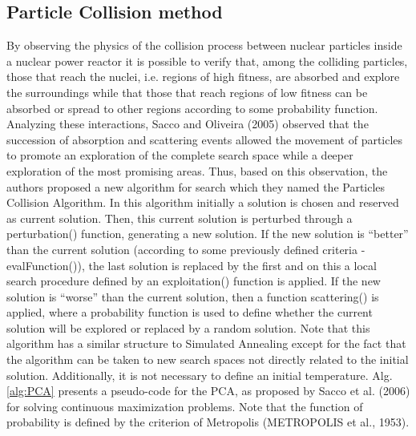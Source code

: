 \subsection{Particle Collision method}
\label{sec:PC}

By observing the physics of the collision process between nuclear particles inside a nuclear power reactor it is possible to verify that, among the colliding particles, those that reach the nuclei, i.e. regions of high fitness, are absorbed and explore the surroundings while that those that reach regions of low fitness can be absorbed or spread to other regions according to some probability function. Analyzing these interactions, Sacco and Oliveira (2005) observed that the succession of absorption and scattering events allowed the movement of particles to promote an exploration of the complete search space while a deeper exploration of the most promising areas. Thus, based on this observation, the authors proposed a new algorithm for search which they named the Particles Collision Algorithm. In this algorithm initially a solution is chosen and reserved as current solution. Then, this current solution is perturbed through a perturbation() function, generating a new solution. If the new solution is “better” than the current solution (according to some previously defined criteria - evalFunction()), the last solution is replaced by the first and on this a local search procedure defined by an exploitation() function is applied. If the new solution is “worse” than the current solution, then a function scattering() is applied, where a probability function is used to define whether the current solution will be explored or replaced by a random solution. Note that this algorithm has a similar structure to Simulated Annealing except for the fact that the algorithm can be taken to new search spaces not directly related to the initial solution. Additionally, it is not necessary to define an initial temperature. Alg. \ref{alg:PCA}  presents a pseudo-code for the PCA, as proposed by Sacco et al. (2006) for solving continuous maximization problems. Note that the function of probability is defined by the criterion of Metropolis (METROPOLIS et al., 1953). 


